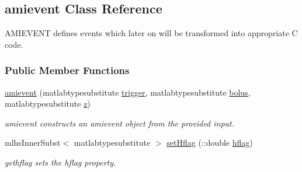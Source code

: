 \hypertarget{classamievent}{}\subsection{amievent Class Reference}
\label{classamievent}


A\+M\+I\+E\+V\+E\+N\+T defines events which later on will be transformed into appropriate C code.  


\subsubsection*{Public Member Functions}
\begin{DoxyCompactItemize}
\item 
\hyperlink{classamievent_a64b7d5a2d9dc65a982f1f9812949b865}{amievent} (matlabtypesubstitute \hyperlink{classamievent_ae194cb817eae4085f8023885100c68dd}{trigger}, matlabtypesubstitute \hyperlink{classamievent_ab9227561ac246ee4b70f9e65c25ffda7}{bolus}, matlabtypesubstitute \hyperlink{classamievent_a25ed1bcb423b0b7200f485fc5ff71c8e}{z})
\begin{DoxyCompactList}\small\item\em amievent constructs an amievent object from the provided input. \end{DoxyCompactList}\item 
mlhs\+Inner\+Subst$<$ matlabtypesubstitute $>$ \hyperlink{classamievent_aef1933f186f69e58e2aa1b00d01f75e7}{set\+Hflag} (\+::double \hyperlink{classamievent_ab98347b5ce6fbe7bd007030346b88575}{hflag})
\begin{DoxyCompactList}\small\item\em gethflag sets the hflag property. \end{DoxyCompactList}\end{DoxyCompactItemize}
